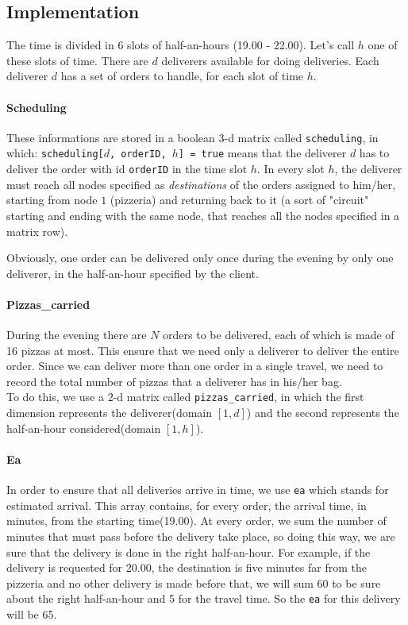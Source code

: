 \documentclass[10pt]{article}
\begin{document}
	\subsection{Implementation}
	
	The time is divided in 6 slots of half-an-hours (19.00 - 22.00). Let's call
	$h$ one of these slots of time.
	There are $d$ deliverers available for doing deliveries.
	Each deliverer $d$ has a set of orders to handle, for each slot of time $h$.

    \paragraph*{Scheduling}
	These informations are stored in a boolean 3-d matrix called 
	\texttt{scheduling}, in which: \texttt{scheduling[$d$, orderID, $h$] = true}
	means that the deliverer $d$ has to deliver the order with id 
	\texttt{orderID} in the time slot $h$. In every slot $h$, the deliverer must 
	reach all nodes specified as \textit{destinations} of the orders assigned to 
	him/her, starting from node $1$ (pizzeria) and returning back to it (a sort
	of "circuit" starting and ending with the same node, that reaches all the 
	nodes specified in a matrix row).

	Obviously, one order can be delivered only once during the evening by only
	one deliverer, in the half-an-hour specified by the client.

	\paragraph*{Pizzas\_carried}
	During the evening there are $N$ orders to be delivered, each of which is made of
	16 pizzas at most. This ensure that we need only a deliverer to deliver the 
	entire order.
	Since we can deliver more than one order in a single travel, we need to
	record the total number of pizzas that a deliverer has in his/her bag.\\
	To do this, we use a 2-d matrix called \texttt{pizzas\_carried}, in which 
	the first dimension represents the deliverer(domain $[1,d]$) and the second 
	represents the half-an-hour considered(domain $[1,h]$).

	\paragraph*{Ea}
	In order to ensure that all deliveries arrive in time, we use \texttt{ea} which
	stands for estimated arrival. This array contains, for every order, the arrival 
	time, in minutes, from the starting time(19.00). At every order, we sum the number 
	of minutes that must pass before the delivery take place, so doing this way,
	we are sure that the delivery is done in the right half-an-hour.
	For example, if the delivery is requested for 20.00, the destination is five minutes 
	far from the pizzeria and no other delivery is made before that, we will sum 60 to 
	be sure about the right half-an-hour and 5 for the travel time. So the \texttt{ea}
	for this delivery will be 65.
\end{document}
